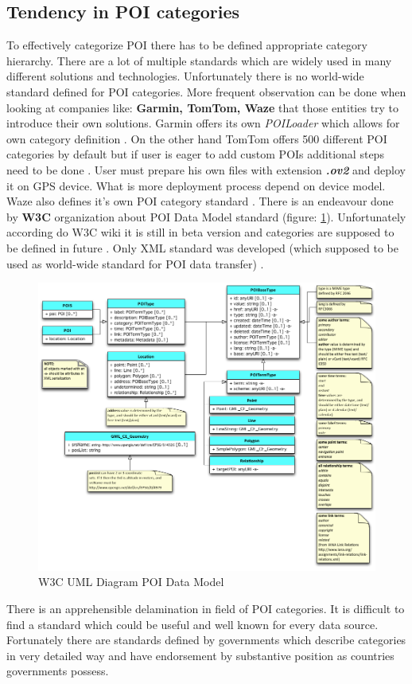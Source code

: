 \subsection{Tendency in POI categories}
To effectively categorize POI there has to be defined appropriate category hierarchy. There are a lot of multiple standards which are widely used in many different solutions and technologies. Unfortunately there is no world-wide standard defined for POI categories. More frequent observation can be done when looking at companies like: \textbf{Garmin, TomTom, Waze} that those entities try to introduce their own solutions. Garmin offers its own \textit{POILoader} which allows for own category definition \cite{9}. On the other hand TomTom offers 500 different POI categories by default but if user is eager to add custom POIs additional steps need to be done \cite{10}. User must prepare his own files with extension \textbf{\textit{.ov2}} and deploy it on GPS device. What is more deployment process depend on device model. Waze also defines it's own POI category standard \cite{14}. There is an endeavour done by \textbf{W3C} organization about POI Data Model standard (figure: \ref{fig:@=w3cDataModel}). Unfortunately according do W3C wiki it is still in beta version and categories are supposed to be defined in future \cite{12}. Only XML standard was developed (which supposed to be used as world-wide standard for POI data transfer) \cite{13}.
\begin{figure}[h]
	\centering
	\includegraphics[scale=0.5]{W3c_poi_model.png}
	\caption{W3C UML Diagram POI Data Model}
	\label{fig:@=w3cDataModel}
\end{figure}
There is an apprehensible delamination in field of POI categories. It is difficult to find a standard which could be useful and well known for every data source. Fortunately there are standards defined by governments which describe categories in very detailed way and have endorsement by substantive position as countries governments possess. 

